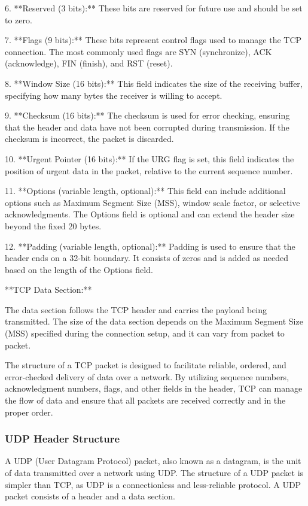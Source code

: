 \documentclass{article}
\begin{document}
6. **Reserved (3 bits):** These bits are reserved for future use and should be set to zero.

7. **Flags (9 bits):** These bits represent control flags used to manage the TCP connection. The most commonly used flags are SYN (synchronize), ACK (acknowledge), FIN (finish), and RST (reset).

8. **Window Size (16 bits):** This field indicates the size of the receiving buffer, specifying how many bytes the receiver is willing to accept.

9. **Checksum (16 bits):** The checksum is used for error checking, ensuring that the header and data have not been corrupted during transmission. If the checksum is incorrect, the packet is discarded.

10. **Urgent Pointer (16 bits):** If the URG flag is set, this field indicates the position of urgent data in the packet, relative to the current sequence number.

11. **Options (variable length, optional):** This field can include additional options such as Maximum Segment Size (MSS), window scale factor, or selective acknowledgments. The Options field is optional and can extend the header size beyond the fixed 20 bytes.

12. **Padding (variable length, optional):** Padding is used to ensure that the header ends on a 32-bit boundary. It consists of zeros and is added as needed based on the length of the Options field.

**TCP Data Section:**

The data section follows the TCP header and carries the payload being transmitted. The size of the data section depends on the Maximum Segment Size (MSS) specified during the connection setup, and it can vary from packet to packet.

The structure of a TCP packet is designed to facilitate reliable, ordered, and error-checked delivery of data over a network. By utilizing sequence numbers, acknowledgment numbers, flags, and other fields in the header, TCP can manage the flow of data and ensure that all packets are received correctly and in the proper order.


\subsubsection{UDP Header Structure}

A UDP (User Datagram Protocol) packet, also known as a datagram, is the unit of data transmitted over a network using UDP. The structure of a UDP packet is simpler than TCP, as UDP is a connectionless and less-reliable protocol. A UDP packet consists of a header and a data section.
\end{document}
